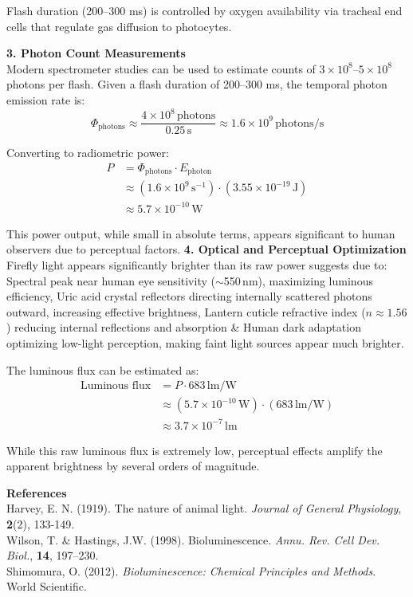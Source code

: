 \begin{technical}
Flash duration (200–300 ms) is controlled by oxygen availability via tracheal end cells that regulate gas diffusion to photocytes.

\noindent\textbf{3. Photon Count Measurements}\\
Modern spectrometer studies can be used to estimate counts of 
$3 \times 10^8$–$5 \times 10^8$ photons per flash. Given a flash duration of 200–300 ms, the temporal photon emission rate is:
\begin{equation}
\Phi_{\text{photons}} \approx 
\frac{4 \times 10^8\,\text{photons}}{0.25\,\text{s}} 
\approx 1.6 \times 10^9\,\text{photons/s}
\end{equation}

Converting to radiometric power:
\begin{align*}
P &= \Phi_{\text{photons}} \cdot E_{\text{photon}} \\
  &\approx (1.6 \times 10^9\,\text{s}^{-1}) \cdot (3.55 \times 10^{-19}\,\text{J}) \\
  &\approx 5.7 \times 10^{-10}\,\text{W}
\end{align*}

This power output, while small in absolute terms, appears significant to human observers due to perceptual factors.
\newline
\noindent\textbf{4. Optical and Perceptual Optimization}\\
Firefly light appears significantly brighter than its raw power suggests due to: Spectral peak near human eye sensitivity ($\sim$550$\,\text{nm}$), maximizing luminous efficiency, Uric acid crystal reflectors directing internally scattered photons outward, increasing effective brightness, Lantern cuticle refractive index ($n \approx 1.56$) reducing internal reflections and absorption \& Human dark adaptation optimizing low-light perception, making faint light sources appear much brighter.

The luminous flux can be estimated as:
\begin{align*}
\text{Luminous flux} &= P \cdot 683\,\text{lm/W} \\
&\approx (5.7 \times 10^{-10}\,\text{W}) \cdot (683\,\text{lm/W}) \\
&\approx 3.7 \times 10^{-7}\,\text{lm}
\end{align*}

While this raw luminous flux is extremely low, perceptual effects amplify the apparent brightness by several orders of magnitude. 

\vspace{0.5em}
\noindent\textbf{References}\\
Harvey, E. N. (1919). The nature of animal light. \textit{Journal of General Physiology}, \textbf{2}(2), 133-149.\\
Wilson, T. \& Hastings, J.W. (1998). Bioluminescence. \textit{Annu. Rev. Cell Dev. Biol.}, \textbf{14}, 197--230.\\
Shimomura, O. (2012). \textit{Bioluminescence: Chemical Principles and Methods}. World Scientific.\\
\end{technical}